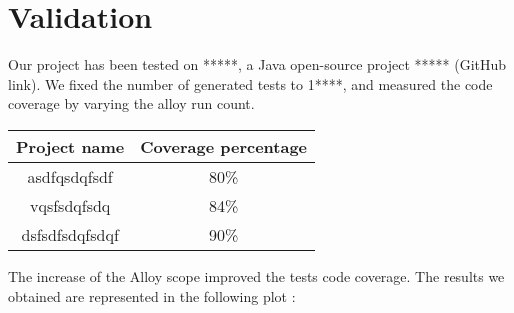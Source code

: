 \section{Validation}
\label{sec:Validation}
	Our project has been tested on *****, a Java open-source project ***** (GitHub link). We fixed the number of generated tests to 1****, and measured the code coverage by varying the alloy run count.
	
\begin{center}
\begin{tabular}{|c|c|}

 \hline
 \textbf{Project name} & \textbf{Coverage percentage}\\
 \hline
 asdfqsdqfsdf   & 80\%\\ 
 \hline
 vqsfsdqfsdq & 84\%\\
 \hline
 dsfsdfsdqfsdqf & 90\%\\

 \hline
\end{tabular}
\end{center}		

The increase of the Alloy scope improved the tests code coverage. The results we obtained are represented in the following plot :\\

\pgfplotsset{width=\textwidth,compat=1.9}

{\setlength{\parindent}{0cm}
}